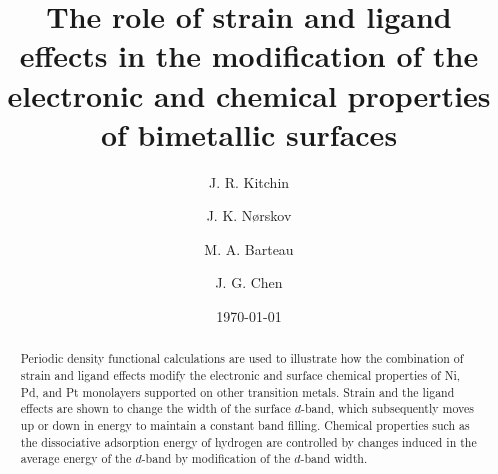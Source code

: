 \documentclass[aps,prl,twocolumn,superscriptaddress,showkeys]{revtex4}
\begin{document}

\title{The role of strain and ligand effects in the modification of
  the electronic and chemical properties of bimetallic surfaces}


\author{J. R. Kitchin}

\author{J. K. N{\o}rskov}

\author{M. A. Barteau}
\author{J. G. Chen}

\date{\today}

\begin{abstract}
Periodic density functional calculations are used to illustrate how
the combination of strain and ligand effects modify the electronic
and surface chemical properties of Ni, Pd, and Pt monolayers
supported on other transition metals. Strain and the ligand effects
are shown to change the width of the surface $d$-band, which
subsequently moves up or down in energy to maintain a constant band
filling. Chemical properties such as the dissociative adsorption
energy of hydrogen are controlled by changes induced in the
average energy of the $d$-band by modification of the $d$-band
width.
\end{abstract}

\pacs{}
\end{document}
